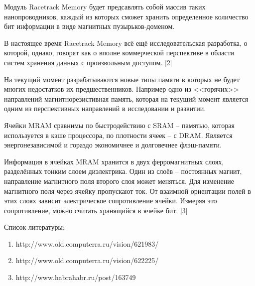 Модуль Racetrack Memory будет предсавлять собой массив таких 
нанопроводников, каждый из которых сможет хранить определенное количество 
бит информации в виде магнитных пузырьков-доменом. 

В настоящее время Racetrack Memory всё ещё исследовательская разработка, 
о которой, однако, говорят как о вполне коммерческой перспективе в области 
систем хранения данных с произвольным доступом. [2]

На текущий момент разрабатываются новые типы памяти в которых не будет 
многих недостатков их предшественников. Например одно из <<горячих>> 
направлений магнитнорезистивная память, которая на текущий момент 
является одним из перспективных направлений в исследовании и развитии.

Ячейки MRAM сравнимы по быстродействию с SRAM -- памятью, которая 
используется в кэше процессора, по плотности ячеек -- с DRAM. Является 
энергонезависимой и гораздо экономичнее и долговечнее флэш-памяти.

Информация в ячейках MRAM хранится в двух ферромагнитных слоях, 
разделённых тонким слоем диэлектрика. Один из слоёв -- постоянных магнит, 
направление магнитного поля второго слоя может меняться. Для изменение 
магнитного поля через ячейку пропускают ток. От взаимной ориентации полей 
в этих слоях зависит электрическое сопротивление ячейки. Измеряя это 
сопротивление, можно считать хранящийся в ячейке бит. [3]

\pagebreak

Список литературы:
\begin{enumerate}
	\item http://www.old.computerra.ru/vision/621983/
	\item http://www.old.computerra.ru/vision/622225/
	\item http://www.habrahabr.ru/post/163749
\end{enumerate} 


